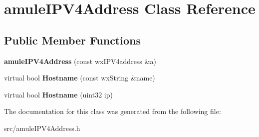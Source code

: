 \section{amuleIPV4Address Class Reference}
\label{classamuleIPV4Address}
\subsection*{Public Member Functions}
\begin{DoxyCompactItemize}
\item 
{\bfseries amuleIPV4Address} (const wxIPV4address \&a)\label{classamuleIPV4Address_a3feea8c10d2202ba327a4d0471af642b}

\item 
virtual bool {\bfseries Hostname} (const wxString \&name)\label{classamuleIPV4Address_ab46016e883dcbe3eb96877d099d6ac12}

\item 
virtual bool {\bfseries Hostname} (uint32 ip)\label{classamuleIPV4Address_afa6752fdb9a6d5b98f817aa4cf05c59a}

\end{DoxyCompactItemize}


The documentation for this class was generated from the following file:\begin{DoxyCompactItemize}
\item 
src/amuleIPV4Address.h\end{DoxyCompactItemize}
